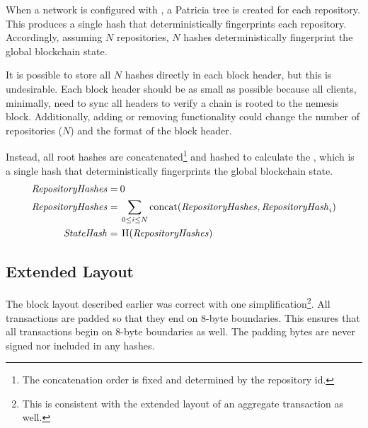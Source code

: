 When a network is configured with , a Patricia tree is created for each repository.
This produces a single hash that deterministically fingerprints each repository.
Accordingly, assuming $N$ repositories, $N$ hashes deterministically fingerprint the global blockchain state.

It is possible to store all $N$ hashes directly in each block header, but this is undesirable.
Each block header should be as small as possible because all clients, minimally, need to sync all headers to verify a chain is rooted to the nemesis block.
Additionally, adding or removing functionality could change the number of repositories ($N$) and the format of the block header.

Instead, all root hashes are concatenated\footnote{The concatenation order is fixed and determined by the repository id.} and hashed to calculate the ,
which is a single hash that deterministically fingerprints the global blockchain state.
\begin{align*}
\mathit{RepositoryHashes} = \: & 0 \\
\mathit{RepositoryHashes} = \: & \sum_{0\leq i \leq N} \operatorname{concat}(\mathit{RepositoryHashes}, \mathit{RepositoryHash}_i) \\
\mathit{StateHash} = \: & \operatorname{H}(\mathit{RepositoryHashes})
\end{align*}

\subsection{Extended Layout}

The block layout described earlier was correct with one simplification\footnote{
This is consistent with the extended layout of an aggregate transaction as well.}.
All transactions are padded so that they end on 8-byte boundaries.
This ensures that all transactions begin on 8-byte boundaries as well.
The padding bytes are never signed nor included in any hashes.

\begin{figure}[H]
\end{figure}
